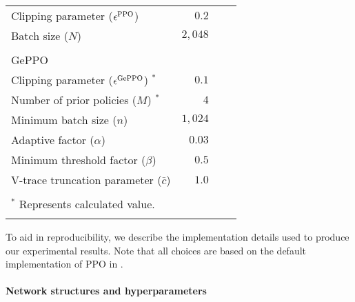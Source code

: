 \documentclass{article}
\begin{document}
\begin{table}
\begin{tabular}{L{0.4}  R{0.12} R{0.12} R{0.12} }
    Clipping parameter ($\epsilon^{\textnormal{PPO}}$) 	& $0.2$ \hspace*{0.5em} \\
    Batch size ($N$) 								& $2{,}048$ \hspace*{0.5em} \\
	\\
	GePPO \\
    \cmidrule(lr){1-1} 	
    Clipping parameter ($\epsilon^{\textnormal{GePPO}}$) $^*$ 	& $0.1$ \hspace*{0.5em} \\
    Number of prior policies ($M$) $^*$ 	                & $4$ \hspace*{0.5em} \\    
	Minimum batch size ($n$) & $1{,}024$  \hspace*{0.5em} \\
	Adaptive factor ($\alpha$) & $0.03$ \hspace*{0.5em} \\
	Minimum threshold factor ($\beta$) & $0.5$  \hspace*{0.5em} \\
	V-trace truncation parameter ($\bar{c}$) & $1.0$ \hspace*{0.5em} \\
	\\
    \cmidrule(lr){1-1}
	\footnotesize{$^*$ Represents calculated value.} \\
	\addlinespace
    \bottomrule
  \end{tabular}
\end{table}

To aid in reproducibility, we describe the implementation details used to produce our experimental results. Note that all choices are based on the default implementation of PPO in \citet{henderson_2018}.

\paragraph{Network structures and hyperparameters}
\end{document}
